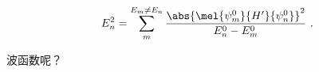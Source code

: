
\begin{issues}
\issueDraft
\end{issues}

\begin{equation}
E_n^2 = \sum_{m}^{E_m\ne E_n} \frac{\abs{\mel{\psi_m^0}{H'}{\psi_n^0}}^2}{E_n^0-E_m^0}~.
\end{equation}

波函数呢？

